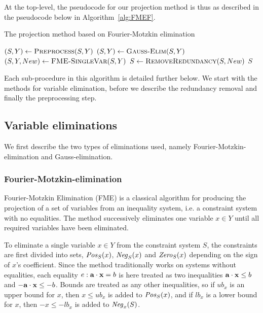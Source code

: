 At the top-level, the pseudocode for our projection method is thus as described in the pseudocode below in Algorithm~\ref{alg:FMEF}. 

\begin{algorithm}
\caption{The projection method based on Fourier-Motzkin elimination} 
\label{alg:FMEF}
\begin{algorithmic}
	\State $(S,Y)\gets \Call{Preprocess}{S,Y}$
	\State $(S,Y)\gets\Call{Gauss-Elim}{S,Y}$
		\State $(S, Y, New )\gets\Call{FME-SingleVar}{S,Y}$
		\State $S\gets\Call{RemoveRedundancy}{S,New}$
	\EndWhile
	\State \Return $S$
\EndFunction
\end{algorithmic}
\end{algorithm}

Each sub-procedure in this algorithm is detailed further below. We start with the methods for variable elimination, before we describe the redundancy removal and finally the preprocessing step.

\subsection{Variable eliminations}
We first describe the two types of eliminations used, namely Fourier-Motzkin-elimination and Gauss-elimination. 
\subsubsection{Fourier-Motzkin-elimination}
Fourier-Motzkin Elimination (FME) is a classical algorithm for producing the projection of a set of variables from an inequality system, i.e. a constraint system with no equalities.
The method successively eliminates one variable $x\in Y$ until all required variables have been eliminated.  

To eliminate a single variable $x\in Y$ from the constraint system $S$, the constraints are first divided into sets, $\mathit{Pos}_S(x)$, $\mathit{Neg}_S(x)$ and $\mathit{Zero}_S(x)$ depending on the sign of $x$'s coefficient. Since the method traditionally works on systems without equalities, each equality $e: \mathbf{a}\cdot\mathbf{x} = b$ is here treated as two inequalities $\mathbf{a}\cdot\mathbf{x} \leq b$ and $-\mathbf{a}\cdot\mathbf{x} \leq -b$. Bounds are treated as any other inequalities, so if $ub_x$ is an upper bound for $x$, then $x\leq ub_x$ is added to $\mathit{Pos}_S(x)$, and if $lb_x$ is a lower bound for $x$, then $-x\leq - lb_x$ is added to $\mathit{Neg}_x(S)$.

